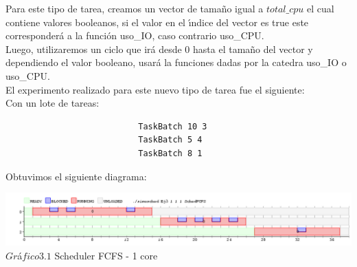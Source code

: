  \indent Para este tipo de tarea, creamos un vector de tamaño igual a $total\_cpu$ el cual contiene valores booleanos, 
 si el valor en el \'{\i}ndice del vector es true este corresponder\'a a la funci\'{o}n uso\_IO, caso contrario uso\_CPU.\\
 Luego, utilizaremos un ciclo que irá desde 0 hasta el tamaño del vector y dependiendo el valor booleano, usará la funciones
 dadas por la catedra uso\_IO o uso\_CPU.\\
 
 \indent El experimento realizado para este nuevo tipo de tarea fue el siguiente:\\
 
 Con un lote de tareas:\\
 
 \begin{verbatim}
                           TaskBatch 10 3
                           TaskBatch 5 4
                           TaskBatch 8 1
 \end{verbatim}

 Obtuvimos el siguiente diagrama:\\
 
 \vspace*{0.3cm} \vspace*{0.3cm}
  \begin{center}
 \includegraphics[scale=0.5]{./Test/ej3.png}
 { $Gr$\'a$fico 3.1$ Scheduler FCFS - 1 core }
 \end{center}
  \vspace*{0.3cm}
 
